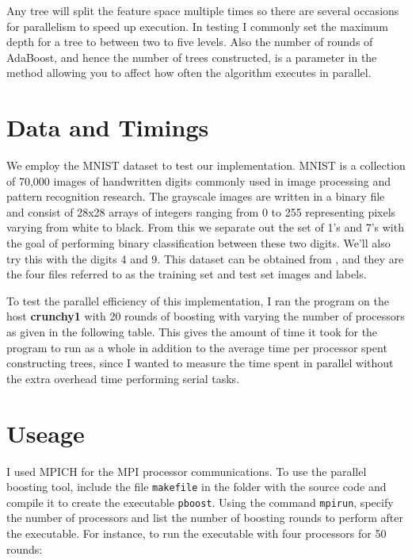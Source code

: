 \documentclass[12pt]{article}
\begin{document}


Any tree will split the feature space multiple times so
there are several occasions for parallelism to speed up execution. In testing I
commonly set the maximum depth for a tree to between two to five levels. Also
the number of rounds of AdaBoost, and hence the number of trees constructed, is
a parameter in the method allowing you to affect how often the algorithm executes in parallel.




\section{Data and Timings}
We employ the MNIST dataset to test our implementation. MNIST is a collection of 70,000 images of handwritten digits commonly used in image processing and pattern recognition research. The grayscale images are written in a binary file and consist of 28x28 arrays of integers ranging from 0 to 255 representing pixels varying from white to black. From this we separate out the set of 1's and 7's with the goal of performing binary classification between these two digits. We'll also try this with the digits 4 and 9. This dataset can be obtained from \cite{MNIST}, and they are the four files referred to as the training set and test set images and labels.

To test the parallel efficiency of this implementation, I ran the program on the host {\bf crunchy1} with 20 rounds of boosting with varying the number of processors as given in the following table. This gives the amount of time it took for the program to run as a whole in addition to the average time per processor spent constructing trees, since I wanted to measure the time spent in parallel without the extra overhead time performing serial tasks.

  





\section{Useage}
I used MPICH for the MPI processor communications. To use the parallel boosting tool, include the file {\tt makefile} in the folder with the source code and compile it to create the executable {\tt pboost}. Using the command {\tt mpirun}, specify the number of processors and list the number of boosting rounds to perform after the executable. For instance, to run the executable with four processors for 50 rounds:
\end{document}

